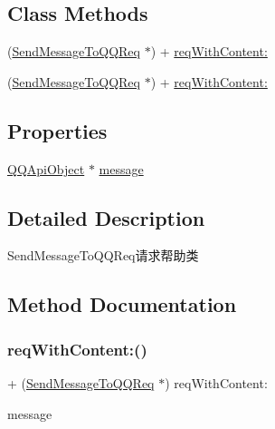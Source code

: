 \subsection*{Class Methods}
\begin{DoxyCompactItemize}
\item 
(\mbox{\hyperlink{interface_send_message_to_q_q_req}{Send\+Message\+To\+Q\+Q\+Req}} $\ast$) + \mbox{\hyperlink{interface_send_message_to_q_q_req_ac68151badf97161084f0c139046065c6}{req\+With\+Content\+:}}
\item 
(\mbox{\hyperlink{interface_send_message_to_q_q_req}{Send\+Message\+To\+Q\+Q\+Req}} $\ast$) + \mbox{\hyperlink{interface_send_message_to_q_q_req_ac68151badf97161084f0c139046065c6}{req\+With\+Content\+:}}
\end{DoxyCompactItemize}
\subsection*{Properties}
\begin{DoxyCompactItemize}
\item 
\mbox{\hyperlink{interface_q_q_api_object}{Q\+Q\+Api\+Object}} $\ast$ \mbox{\hyperlink{interface_send_message_to_q_q_req_abc994246c5c76b9c3333f656400d933c}{message}}
\end{DoxyCompactItemize}


\subsection{Detailed Description}
Send\+Message\+To\+Q\+Q\+Req请求帮助类 

\subsection{Method Documentation}
\mbox{\label{interface_send_message_to_q_q_req_ac68151badf97161084f0c139046065c6}} 
\subsubsection{\texorpdfstring{req\+With\+Content\+:()}{reqWithContent:()}\hspace{0.1cm}{\footnotesize\ttfamily [1/2]}}
{\footnotesize\ttfamily + (\mbox{\hyperlink{interface_send_message_to_q_q_req}{Send\+Message\+To\+Q\+Q\+Req}} $\ast$) req\+With\+Content\+: \begin{DoxyParamCaption}\item[{(\mbox{\hyperlink{interface_q_q_api_object}{Q\+Q\+Api\+Object}} $\ast$)}]{message }\end{DoxyParamCaption}}

